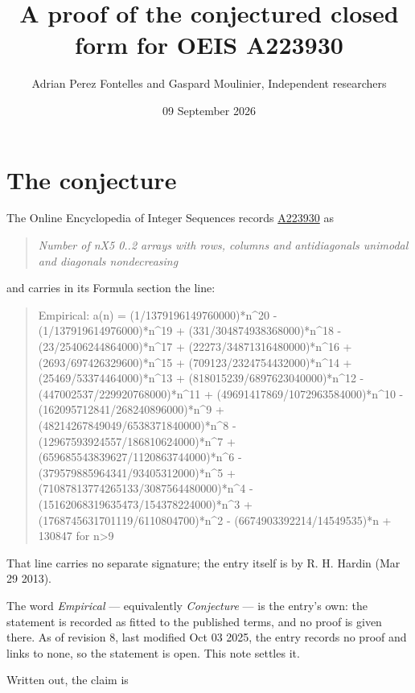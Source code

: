 \documentclass[11pt]{article}
\title{A proof of the conjectured closed form for OEIS A223930}
\author{Adrian Perez Fontelles and Gaspard Moulinier, Independent researchers}
\date{09 September 2026}
\theoremstyle{definition}
\begin{document}
\maketitle
\section{The conjecture}

The Online Encyclopedia of Integer Sequences records \href{https://oeis.org/A223930}{A223930} as

\begin{quote}\itshape Number of nX5 0..2 arrays with rows, columns and antidiagonals unimodal and diagonals nondecreasing\end{quote}

and carries in its Formula section the line:

\begin{quote}\ttfamily Empirical: a(n) = (1/1379196149760000)*n\textasciicircum{}20 - (1/137919614976000)*n\textasciicircum{}19 + (331/304874938368000)*n\textasciicircum{}18 - (23/25406244864000)*n\textasciicircum{}17 + (22273/34871316480000)*n\textasciicircum{}16 + (2693/697426329600)*n\textasciicircum{}15 + (709123/2324754432000)*n\textasciicircum{}14 + (25469/53374464000)*n\textasciicircum{}13 + (818015239/6897623040000)*n\textasciicircum{}12 - (447002537/229920768000)*n\textasciicircum{}11 + (49691417869/1072963584000)*n\textasciicircum{}10 - (162095712841/268240896000)*n\textasciicircum{}9 + (48214267849049/6538371840000)*n\textasciicircum{}8 - (12967593924557/186810624000)*n\textasciicircum{}7 + (659685543839627/1120863744000)*n\textasciicircum{}6 - (379579885964341/93405312000)*n\textasciicircum{}5 + (71087813774265133/3087564480000)*n\textasciicircum{}4 - (15162068319635473/154378224000)*n\textasciicircum{}3 + (1768745631701119/6110804700)*n\textasciicircum{}2 - (6674903392214/14549535)*n + 130847 for n>9\end{quote}

That line carries no separate signature; the entry itself is by R. H. Hardin (Mar 29 2013).

The word {\itshape Empirical} --- equivalently {\itshape Conjecture} --- is the entry's own: the statement is recorded as fitted to the published terms, and no proof is given there. As of revision 8, last modified Oct 03 2025, the entry records no proof and links to none, so the statement is open. This note settles it.

Written out, the claim is
\end{document}
